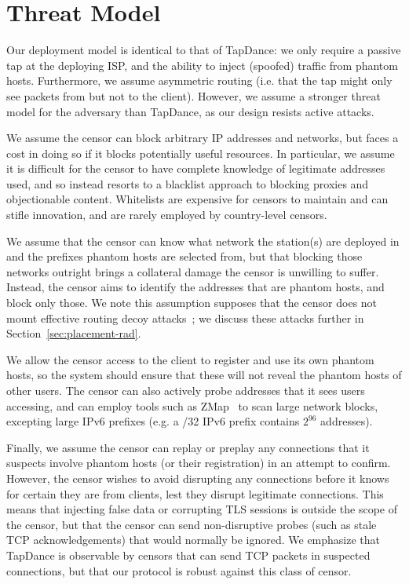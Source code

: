 \documentclass[sigconf]{acmart}
\begin{document}



\section{Threat Model}


Our deployment model is identical to that of TapDance: we only require a passive
tap at the deploying ISP, and the ability to inject (spoofed) traffic from phantom
hosts.
Furthermore, we assume
asymmetric routing (i.e. that the tap might only see packets from but not to the
client).
However, we assume a stronger threat model for the adversary than
TapDance, as our design resists active attacks.


We assume the censor can block arbitrary IP addresses and networks, but faces a
cost in doing so if it blocks potentially useful resources. In particular, we
assume it is difficult for the censor to have complete knowledge of legitimate
addresses used, and so instead resorts to a blacklist approach to blocking
proxies and objectionable content.
Whitelists are expensive for censors to maintain and can stifle
innovation, and are rarely employed by country-level censors.


We assume that the censor can know what network the \scheme station(s) are
deployed in and the prefixes phantom hosts are selected from, but that blocking those
networks outright brings a collateral
damage the censor is unwilling to suffer. Instead, the censor aims to identify
the addresses that are phantom hosts, and block only those. We note this
assumption supposes that the censor does not mount effective routing
decoy attacks~\cite{rad12,true-cost-rad}; we discuss these attacks further in Section~\ref{sec:placement-rad}.

We allow the censor access to the client to register and use its own phantom hosts, 
so the system should ensure that these will not reveal the phantom hosts of other users. The
censor can also actively probe addresses that it sees users accessing, and can
employ tools such as ZMap~\cite{zmap13} to scan large network blocks, excepting
large IPv6 prefixes (e.g. a /32 IPv6 prefix contains $2^{96}$ addresses).

Finally, we assume the censor can replay or preplay any connections that it
suspects involve phantom hosts (or their registration) in an attempt to confirm.
However, the censor wishes to avoid disrupting any connections before it
knows for certain they are from \scheme clients, lest they disrupt legitimate
connections. This means that injecting false data or corrupting TLS sessions is
outside the scope of the censor, but that the censor can send non-disruptive
probes (such as stale TCP acknowledgements) that would normally
be ignored. We emphasize that TapDance is observable by censors that can send
TCP packets in suspected connections, but that our protocol is robust against
this class of censor.
\end{document}

